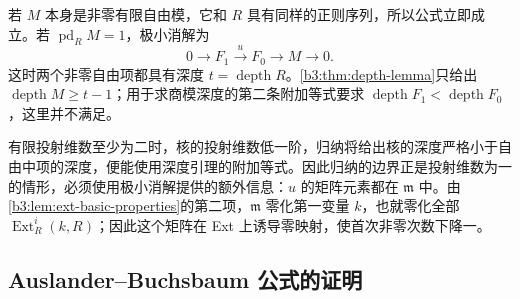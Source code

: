 \ProseParagraphBreak

若 \(M\) 本身是非零有限自由模，它和 \(R\) 具有同样的正则序列，所以公式立即成立。若 \(\operatorname{pd}_RM=1\)，极小消解为
\[
	0\longrightarrow F_1\xrightarrow{u}F_0\longrightarrow M\longrightarrow0.
\]
这时两个非零自由项都具有深度 \(t=\operatorname{depth}R\)。\cref{b3:thm:depth-lemma}只给出 \(\operatorname{depth}M\ge t-1\)；用于求商模深度的第二条附加等式要求 \(\operatorname{depth}F_1<\operatorname{depth}F_0\)，这里并不满足。

\ProseParagraphBreak
有限投射维数至少为二时，核的投射维数低一阶，归纳将给出核的深度严格小于自由中项的深度，便能使用深度引理的附加等式。因此归纳的边界正是投射维数为一的情形，必须使用极小消解提供的额外信息：\(u\) 的矩阵元素都在 \(\mathfrak m\) 中。由\cref{b3:lem:ext-basic-properties}的第二项，\(\mathfrak m\) 零化第一变量 \(k\)，也就零化全部 \(\operatorname{Ext}_R^i(k,R)\)；因此这个矩阵在 Ext 上诱导零映射，使首次非零次数下降一。

\subsection{Auslander–Buchsbaum 公式的证明}
\label{b3:subsec:1703:03}

